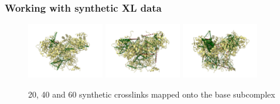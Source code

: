 \documentclass[a4paper,8pt]{beamer}
\begin{document}
\begin{frame}
\frametitle{Working with synthetic XL data}
%
\begin{figure}
  \centering
\includegraphics[width=0.3\textwidth]{test-figures/20_syn.png}
\includegraphics[width=0.3\textwidth]{test-figures/40_syn.png}
\includegraphics[width=0.3\textwidth]{test-figures/60_syn.png}
\caption{20, 40 and 60 synthetic crosslinks mapped onto the base subcomplex}
\end{figure}
\end{frame}
\end{document}
